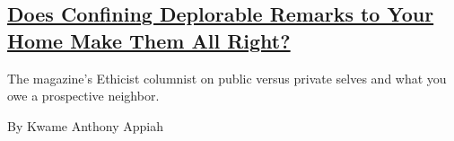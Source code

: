\begin{enumerate}
  \hypertarget{does-confining-deplorable-remarks-to-your-home-make-them-all-right}{%
  \subsection{\texorpdfstring{\href{/2017/04/19/magazine/does-confining-deplorable-remarks-to-your-home-make-them-all-right.html}{Does
  Confining Deplorable Remarks to Your Home Make Them All
  Right?}}{Does Confining Deplorable Remarks to Your Home Make Them All Right?}}\label{does-confining-deplorable-remarks-to-your-home-make-them-all-right}}

  The magazine's Ethicist columnist on public versus private selves and
  what you owe a prospective neighbor.

  By Kwame Anthony Appiah
\end{enumerate}

